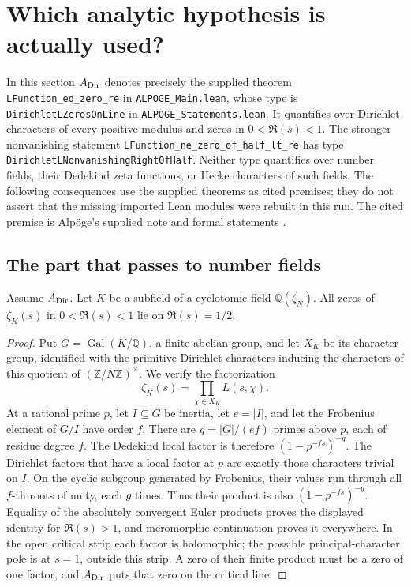 \section{Which analytic hypothesis is actually used?}
\label{sec:complexity-grh}

In this section \(A_{\rm Dir}\) denotes precisely the supplied theorem
\texttt{LFunction\_eq\_zero\_re} in \texttt{ALPOGE\_Main.lean}, whose type is
\texttt{DirichletLZerosOnLine} in \texttt{ALPOGE\_Statements.lean}.
It quantifies over Dirichlet characters of every positive modulus and zeros in
\(0<\Re(s)<1\).  The stronger nonvanishing statement
\texttt{LFunction\_ne\_zero\_of\_half\_lt\_re} has type
\texttt{DirichletLNonvanishingRightOfHalf}.  Neither type quantifies over number
fields, their Dedekind zeta functions, or Hecke characters of such fields.
The following consequences use the supplied theorems as cited premises; they
do not assert that the missing imported Lean modules were rebuilt in this run.
The cited premise is Alp\"oge's supplied note and formal statements
\cite{CAlpoge26}.

\subsection{The part that passes to number fields}

\begin{proposition}
Assume \(A_{\rm Dir}\).  Let \(K\) be a subfield of a cyclotomic field
\(\mathbb Q(\zeta_N)\).  All zeros of \(\zeta_K(s)\) in
\(0<\Re(s)<1\) lie on \(\Re(s)=1/2\).
\end{proposition}
\begin{proof}
Put \(G=\operatorname{Gal}(K/\mathbb Q)\), a finite abelian group, and let
\(X_K\) be its character group, identified with the primitive Dirichlet
characters inducing the characters of this quotient of
\((\mathbb Z/N\mathbb Z)^\times\).  We verify the factorization
\[
 \zeta_K(s)=\prod_{\chi\in X_K}L(s,\chi).
\]
At a rational prime \(p\), let \(I\subseteq G\) be inertia, let
\(e=|I|\), and let the Frobenius element of \(G/I\) have order \(f\).
There are \(g=|G|/(ef)\) primes above \(p\), each of residue degree \(f\).
The Dedekind local factor is therefore \((1-p^{-fs})^{-g}\).
The Dirichlet factors that have a local factor at \(p\) are exactly those
characters trivial on \(I\).  On the cyclic subgroup generated by Frobenius,
their values run through all \(f\)-th roots of unity, each \(g\) times.
Thus their product is also \((1-p^{-fs})^{-g}\).  Equality of the absolutely
convergent Euler products proves the displayed identity for \(\Re(s)>1\),
and meromorphic continuation proves it everywhere.  In the open critical
strip each factor is holomorphic; the possible principal-character pole is
at \(s=1\), outside this strip.  A zero of their finite product must be a
zero of one factor, and \(A_{\rm Dir}\) puts that zero on the critical line.
\end{proof}

